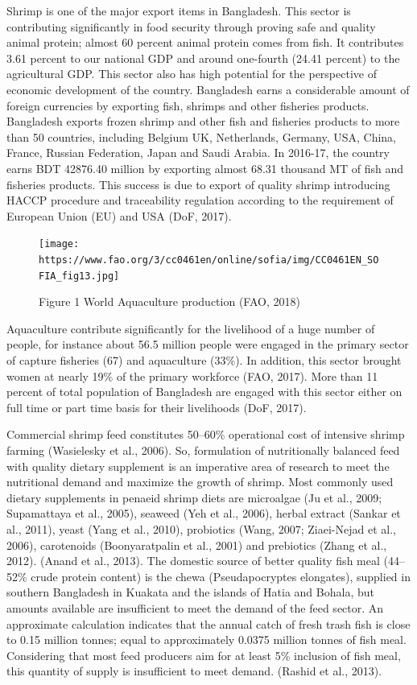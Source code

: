 \documentclass[
]{book}
\begin{document}
Shrimp is one of the major export items in Bangladesh. This sector is
contributing significantly in food security through proving safe and
quality animal protein; almost 60 percent animal protein comes from
fish. It contributes 3.61 percent to our national GDP and around
one-fourth (24.41 percent) to the agricultural GDP. This sector also has
high potential for the perspective of economic development of the
country. Bangladesh earns a considerable amount of foreign currencies by
exporting fish, shrimps and other fisheries products. Bangladesh exports
frozen shrimp and other fish and fisheries products to more than 50
countries, including Belgium UK, Netherlands, Germany, USA, China,
France, Russian Federation, Japan and Saudi Arabia. In 2016-17, the
country earns BDT 42876.40 million by exporting almost 68.31 thousand MT
of fish and fisheries products. This success is due to export of quality
shrimp introducing HACCP procedure and traceability regulation according
to the requirement of European Union (EU) and USA (DoF, 2017).

\begin{figure}
\centering
\texttt{[image: https://www.fao.org/3/cc0461en/online/sofia/img/CC0461EN\_SOFIA\_fig13.jpg]}
\caption{Figure 1 World Aquaculture production (FAO,
2018)}
\end{figure}

Aquaculture contribute significantly for the livelihood of a huge number
of people, for instance about 56.5 million people were engaged in the
primary sector of capture fisheries (67) and aquaculture (33\%). In
addition, this sector brought women at nearly 19\% of the primary
workforce (FAO, 2017). More than 11 percent of total population of
Bangladesh are engaged with this sector either on full time or part time
basis for their livelihoods (DoF, 2017).

Commercial shrimp feed constitutes 50--60\% operational cost of intensive
shrimp farming (Wasielesky et al., 2006). So, formulation of
nutritionally balanced feed with quality dietary supplement is an
imperative area of research to meet the nutritional demand and maximize
the growth of shrimp. Most commonly used dietary supplements in penaeid
shrimp diets are microalgae (Ju et al., 2009; Supamattaya et al., 2005),
seaweed (Yeh et al., 2006), herbal extract (Sankar et al., 2011), yeast
(Yang et al., 2010), probiotics (Wang, 2007; Ziaei-Nejad et al., 2006),
carotenoids (Boonyaratpalin et al., 2001) and prebiotics (Zhang et al.,
2012). (Anand et al., 2013). The domestic source of better quality fish
meal (44--52\% crude protein content) is the chewa (Pseudapocryptes
elongates), supplied in southern Bangladesh in Kuakata and the islands
of Hatia and Bohala, but amounts available are insufficient to meet the
demand of the feed sector. An approximate calculation indicates that the
annual catch of fresh trash fish is close to 0.15 million tonnes; equal
to approximately 0.0375 million tonnes of fish meal. Considering that
most feed producers aim for at least 5\% inclusion of fish meal, this
quantity of supply is insufficient to meet demand. (Rashid et al.,
2013).
\end{document}
